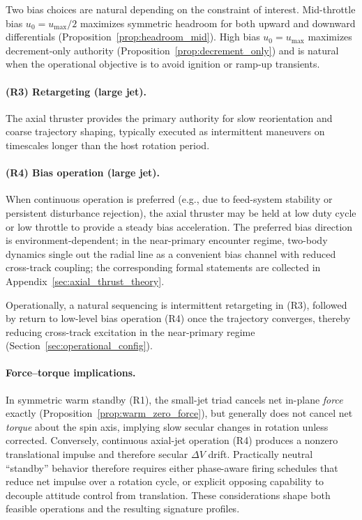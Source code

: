 \documentclass{article}
\begin{document}
Two bias choices are natural depending on the constraint of interest. Mid-throttle bias $u_0=u_{\max}/2$ maximizes symmetric headroom for both upward and downward differentials (Proposition~\ref{prop:headroom_mid}). High bias $u_0=u_{\max}$ maximizes decrement-only authority (Proposition~\ref{prop:decrement_only}) and is natural when the operational objective is to avoid ignition or ramp-up transients.

\paragraph{(R3) Retargeting (large jet).}
The axial thruster provides the primary authority for slow reorientation and coarse trajectory shaping, typically executed as intermittent maneuvers on timescales longer than the host rotation period.

\paragraph{(R4) Bias operation (large jet).}
When continuous operation is preferred (e.g., due to feed-system stability or persistent disturbance rejection), the axial thruster may be held at low duty cycle or low throttle to provide a steady bias acceleration. The preferred bias direction is environment-dependent; in the near-primary encounter regime, two-body dynamics single out the radial line as a convenient bias channel with reduced cross-track coupling; the corresponding formal statements are collected in Appendix~\ref{sec:axial_thrust_theory}.

Operationally, a natural sequencing is intermittent retargeting in (R3), followed by return to low-level bias operation (R4) once the trajectory converges, thereby reducing cross-track excitation in the near-primary regime (Section~\ref{sec:operational_config}).

\paragraph{Force--torque implications.}
In symmetric warm standby (R1), the small-jet triad cancels net in-plane \emph{force} exactly (Proposition~\ref{prop:warm_zero_force}), but generally does not cancel net \emph{torque} about the spin axis, implying slow secular changes in rotation unless corrected. Conversely, continuous axial-jet operation (R4) produces a nonzero translational impulse and therefore secular $\Delta V$ drift. Practically neutral ``standby'' behavior therefore requires either phase-aware firing schedules that reduce net impulse over a rotation cycle, or explicit opposing capability to decouple attitude control from translation. These considerations shape both feasible operations and the resulting signature profiles.
\end{document}
